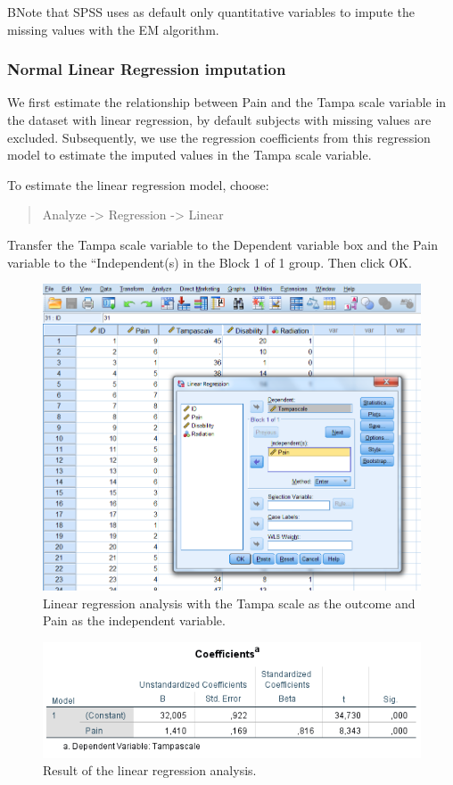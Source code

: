 \documentclass[]{book}
\begin{document}
BNote that SPSS uses as default only quantitative variables to impute
the missing values with the EM algorithm.

\subsubsection{Normal Linear Regression
imputation}\label{normal-linear-regression-imputation}

We first estimate the relationship between Pain and the Tampa scale
variable in the dataset with linear regression, by default subjects with
missing values are excluded. Subsequently, we use the regression
coefficients from this regression model to estimate the imputed values
in the Tampa scale variable.

To estimate the linear regression model, choose:

\begin{quote}
Analyze -\textgreater{} Regression -\textgreater{} Linear
\end{quote}

Transfer the Tampa scale variable to the Dependent variable box and the
Pain variable to the ``Independent(s) in the Block 1 of 1 group. Then
click OK.

\begin{figure}

{\centering \includegraphics[width=0.7\linewidth]{images/fig3.14} 

}

\caption{Linear regression analysis with the Tampa scale as the outcome and Pain as the independent variable.}\label{fig:fig3-14}
\end{figure}

\begin{figure}

{\centering \includegraphics[width=0.7\linewidth]{images/table3.3} 

}

\caption{Result of the linear regression analysis.}\label{fig:tab3-3}
\end{figure}
\end{document}
